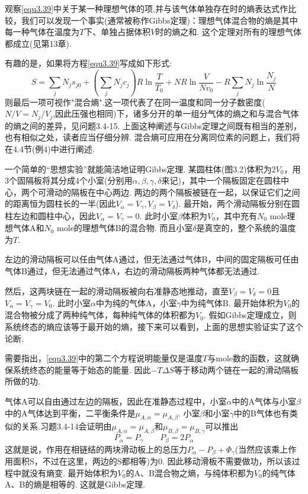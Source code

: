 观察\eqref{equ3.39}中关于某一种理想气体的项,并与该气体单独存在时的熵表达式作比较，我们可以发现一个事实(通常被称作Gibbs定理)：理想气体混合物的熵是其中每一种气体在温度为$T$下、单独占据体积$V$时的熵之和. 这个定理对所有的理想气体都成立(见第13章).

有趣的是，如果将方程\eqref{equ3.39}写成如下形式:
\begin{equation}
\label{equ3.40}
S=\sum_jN_js_{j0}+\left(\sum_jN_jc_{j}\right)R\ln{\frac{T}{T_0}}+NR\ln{\frac{V}{Nv_0}}-R\sum_jN_j\ln{\frac{N_j}{N}}
\end{equation}
则最后一项可视作"混合熵".这一项代表了在同一温度和同一分子数密度($N/V=N_j/V_j$,因此压强也相同)下，诸多分开的单一组分气体的熵之和与混合气体的熵之间的差异，见问题3.4-15. 上面这种阐述与Gibbs定理之间既有相当的差别，也有相似之处，读者应当仔细分辨. 混合熵可应用在分离同位素的问题上，我们将在4.4节(例4)中进行阐述.

一个简单的“思想实验”就能简洁地证明Gibbs定理. 某圆柱体(图3.2)体积为$2V_0$，用3个固隔板将其分成4个小室(分别用$\alpha,\beta,\gamma,\delta$来记)，其中一个隔板固定在圆柱中心，两个可滑动的隔板在中心两边. 两边的两个隔板被链在一起，以保证它们之间的距离恒为圆柱长的一半(因此$V_\alpha=V_\gamma, V_\beta=V_\delta$). 最开始，两个滑动隔板分别在圆柱左边和圆柱中心，因此$V_\alpha=V_\gamma=0$. 此时小室$\beta$体积为$V_0$，其中充有$N_0$  mole理想气体A和$N_0$ mole的理想气体B的混合物. 而且小室$\delta$是真空的，整个系统的温度为$T$.

左边的滑动隔板可以任由气体A通过，但无法通过气体B，中间的固定隔板可任由气体B通过，但无法通过气体A，右边的滑动隔板两种气体都无法通过.

然后，这两块链在一起的滑动隔板被向右准静态地推动，直至$V_\beta=V_\delta=0$且$V_\alpha=V_\gamma=V_0$. 此时小室$\alpha$中为纯的气体A，小室$\gamma$中为纯气体B. 最开始体积为$V_0$的混合物被分成了两种纯气体，每种纯气体的体积都为$V_0$. 假如Gibbs定理成立，则系统终态的熵应该等于最开始的熵，接下来可以看到，上面的思想实验证实了这个论断.

需要指出，\eqref{equ3.39}中的第二个方程说明能量仅是温度$T$与mole数的函数，这就确保系统终态的能量等于始态的能量. 因此$-T\Delta S$等于移动两个链在一起的滑动隔板所做的功.

气体A可以自由通过左边的隔板，因此在准静态过程中，小室$\alpha$中的A气体与小室$\beta$中的A气体达到平衡，二平衡条件是$\mu_{A,\alpha}=\mu_{A,\beta}$. 小室$\beta$和小室$\gamma$中的B气体也有类似的关系.习题3.4-14会证明由$\mu_{A,\alpha}=\mu_{A,\beta}$和$\mu_{B,\beta}=\mu_{B,\gamma}$可以推出
\begin{equation}
P_\alpha=P_\gamma \qquad P_\beta=2P_\alpha
\end{equation}
这就是说，作用在相链结的两块滑动板上的总压力$P_\alpha-P_\beta+\Phi_\gamma$(当然应该乘上作用面积S，不过在这里，两边的S都相等)为0. 因此移动滑板不需要做功，所以该过程中就没有熵变. 最开始体积为$V_0$的A、B混合物之熵，与纯体积都为$V_0$的纯气体A、B的熵是相等的. 这就是Gibbs定理.

